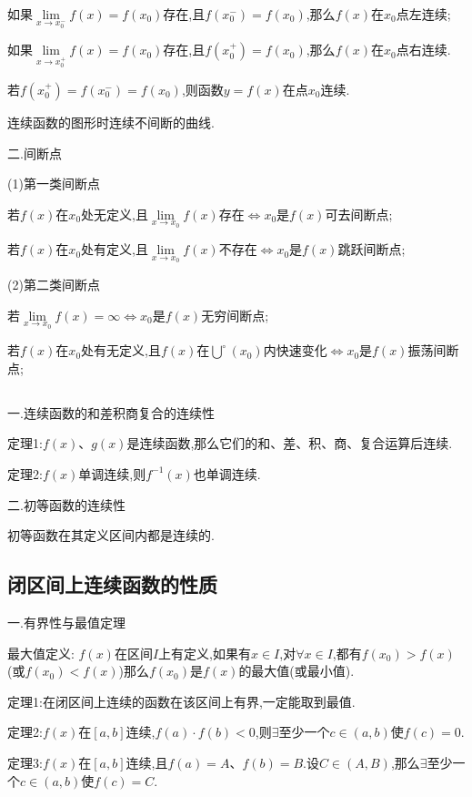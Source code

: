 \documentclass[utf8]{ctexart}
\begin{document}
如果$\lim \limits_{x\to x_0^-}f(x)=f(x_0)$存在,且$f(x_0^-)=f(x_0)$,那么$f(x)$在$x_0$点左连续;

如果$\lim \limits_{x\to x_0^+}f(x)=f(x_0)$存在,且$f(x_0^+)=f(x_0)$,那么$f(x)$在$x_0$点右连续.

若$f(x_0^+)=f(x_0^-)=f(x_0)$,则函数$y=f(x)$在点$x_0$连续.

连续函数的图形时连续不间断的曲线.

二.间断点

(1)第一类间断点

若$f(x)$在$x_0$处无定义,且$\lim\limits_{x\to x_0} f(x)$存在$\Leftrightarrow x_0$是$f(x)$可去间断点;

若$f(x)$在$x_0$处有定义,且$\lim\limits_{x\to x_0}  f(x)$不存在$\Leftrightarrow x_0$是$f(x)$跳跃间断点;

(2)第二类间断点

若$\lim \limits_{x\to x_0}f(x)=\infty \Leftrightarrow x_0$是$f(x)$无穷间断点;

若$f(x)$在$x_0$处有无定义,且$f(x)$在$\bigcup \limits ^{\circ}(x_0)$内快速变化$\Leftrightarrow x_0$是$f(x)$振荡间断点;

\subsection{}

一.连续函数的和差积商复合的连续性

定理1:$f(x)$、$g(x)$是连续函数,那么它们的和、差、积、商、复合运算后连续.

定理2:$f(x)$单调连续,则$f^{-1}(x)$也单调连续.

二.初等函数的连续性

初等函数在其定义区间内都是连续的.

\subsection{\heiti 闭区间上连续函数的性质}

一.有界性与最值定理

最大值定义:
$f(x)$在区间$I$上有定义,如果有$x\in I$,对$\forall x\in I$,都有$f(x_0)>f(x)$(或$f(x_0)<f(x)$)那么$f(x_0)$是$f(x)$的最大值(或最小值).

定理1:在闭区间上连续的函数在该区间上有界,一定能取到最值.

定理2:$f(x)$在$\left[a,b\right]$连续,$f(a)\cdot f(b)<0$,则$\exists $至少一个$c\in (a,b)$使$f(c)=0$.

定理3:$f(x)$在$\left[a,b\right]$连续,且$f(a)=A$、$f(b)=B$.设$C\in (A,B)$,那么$\exists $至少一个$c\in (a,b)$使$f(c)=C$.
\end{document}
